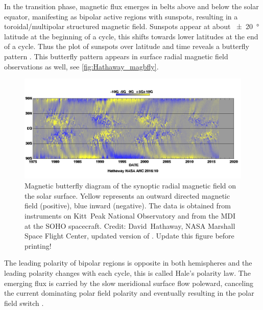 In the transition phase, magnetic flux emerges in belts above and below the solar equator, manifesting as bipolar active regions with sunspots, resulting in a toroidal/multipolar structured magnetic field. Sunspots appear at about \SI{+-20}{\degree} latitude at the beginning of a cycle, this shifts towards lower latitudes at the end of a cycle. Thus the plot of sunspots over latitude and time reveals a butterfly pattern \citep{Maunder1904}. This butterfly pattern appears in surface radial magnetic field observations as well, see \autoref{fig:Hathaway_magbfly}.
\begin{figure}[htb]
	\centering
	\includegraphics[width=\textwidth]{figures_of_others/images/Hathaway_magbfly_201610.jpg}
	\caption{Magnetic butterfly diagram of the synoptic radial magnetic field on the solar surface. Yellow represents an outward directed magnetic field (positive), blue inward (negative). The data is obtained from instruments on Kitt~Peak National Observatory and from the MDI at the SOHO spacecraft. Credit: David~Hathaway, NASA Marshall Space Flight Center, updated version of \citet[][Fig.~17]{Hathaway2015}. Update this figure before printing!}
	\label{fig:Hathaway_magbfly}
\end{figure}
The leading polarity of bipolar regions is opposite in both hemispheres and the leading polarity changes with each cycle, this is called Hale's polarity law. The emerging flux is carried by the slow meridional surface flow poleward, canceling the current dominating polar field polarity and eventually resulting in the polar field switch \citep{Hathaway2015}.

